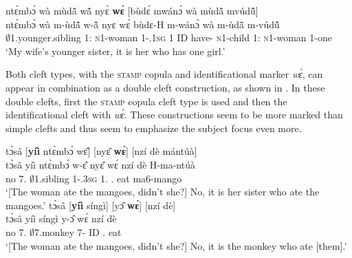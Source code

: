 \ea\label{cleft3} 
  \glll ntɛ́mbɔ̀ wà mùdã̂ wã̂ nyɛ̀ {\bfseries wɛ́} [bùdɛ́ mwánɔ̀ wà mùdã̂ mvúdũ̂]\textsubscript{{\REL}} \\
       ntɛ́mbɔ̀ wà m-ùdã̂ w-ã̂ nyɛ wɛ́ {\db}bùdɛ-H m-wánɔ̀ wà m-ùdã̂ m-vúdũ̂ \\
        $\emptyset$1.younger.sibling 1:{\ATT} \textsc{n}1-woman 1-{\POSS}.1\textsc{sg} 1 ID {\db}have-{\R} \textsc{n}1-child 1:{\ATT} \textsc{n}1-woman 1-one    \\
    \trans `My wife's younger sister, it is her who has one girl.'
\z


Both cleft types, with the \textsc{stamp} copula and identificational marker {\itshape wɛ́}, can appear in combination as a double cleft construction, as shown in .  In these double clefts, first the \textsc{stamp} copula cleft type is used and then the identificational cleft with {\itshape wɛ́}. These constructions seem to be more marked than simple clefts and thus seem to emphasize the subject focus even more.


\ea\label{cleft4}  
\ea\label{cleft4b}
  \glll tɔ̀sâ [{\bfseries yíì} ntɛ̀mbɔ́ wɛ̂] [nyɛ̂ {\bfseries wɛ́}] [nzí dè mántúà]\textsubscript{{\REL}}\\
         tɔ̀sâ {\db}yíì ntɛ̀mbɔ́ w-ɛ̂ {\db}nyɛ̂ wɛ́ {\db}nzí dè H-ma-ntúà\\
       no {\db}7.{\COP} $\emptyset$1.sibling 1-{\POSS}.3\textsc{sg} {\db}1.{\OBJ} {\ID} {\db}{\PROG}.{\PST} eat ma6-mango \\
    \trans `[The woman ate the mangoes, didn't she?{\textemdash}] No, it is her sister who ate the mangoes.'
\ex \label{cleft4c}
  \glll tɔ̀sâ [{\bfseries yíì} síngì] [yɔ̂ {\bfseries wɛ́}] [nzí dè]\textsubscript{{\REL}}\\
        tɔ̀sâ {\db}yíì síngì {\db}y-ɔ̂ wɛ́ {\db}nzí dè\\
       no {\db}7.{\COP} $\emptyset$7.monkey {\db}7-{\OBJ} ID {\db}{\PROG}.{\PST} eat  \\
    \trans `[The woman ate the mangoes, didn't she?{\textemdash}] No, it is the monkey who ate [them].'
\z
\z








